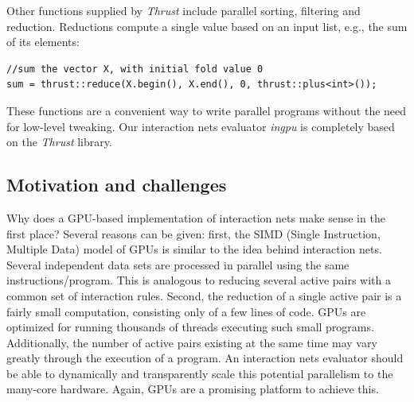 \documentclass[submission,copyright,creativecommons]{eptcs}
\begin{document}
Other functions supplied by \emph{Thrust} include parallel sorting, filtering
and reduction. Reductions compute a single value based on an input list, e.g.,
the sum of its elements:

\begin{lstlisting}
//sum the vector X, with initial fold value 0
sum = thrust::reduce(X.begin(), X.end(), 0, thrust::plus<int>());
\end{lstlisting}
%

These functions are a
convenient way to write parallel programs without the need for low-level
tweaking. Our interaction nets evaluator \emph{ingpu} is completely based on the
\emph{Thrust} library.

\subsection{Motivation and challenges}
\label{sec:motivation_and_challenges}
Why does a GPU-based implementation of interaction nets make sense in the first
place? Several reasons can be given: first, the SIMD (Single Instruction, Multiple
Data) model of GPUs is similar to the idea behind interaction nets. Several
independent data sets are processed in parallel using the same
instructions/program. This is analogous to reducing several active pairs with a
common set of interaction rules. Second, the reduction of a single active pair is a
fairly small computation, consisting only of a few lines of code. GPUs are
optimized for running thousands of threads executing such small programs.
Additionally, the number of active pairs existing at the same time may vary
greatly through the execution of a program. An interaction nets evaluator should
be able to dynamically and transparently scale this potential parallelism to the
many-core hardware. Again, GPUs are a promising platform to achieve this.
\end{document}
